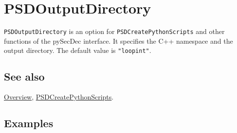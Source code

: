 \documentclass[../FeynHelpersManual.tex]{subfiles}
\begin{document}
\hypertarget{psdoutputdirectory}{
\section{PSDOutputDirectory}\label{psdoutputdirectory}}

\texttt{PSDOutputDirectory} is an option for
\texttt{PSDCreatePythonScripts} and other functions of the pySecDec
interface. It specifies the C++ namespace and the output directory. The
default value is \texttt{"loopint"}.

\subsection{See also}

\hyperlink{toc}{Overview},
\hyperlink{psdcreatepythonscripts}{PSDCreatePythonScripts}.

\subsection{Examples}
\end{document}
